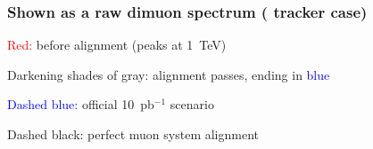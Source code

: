 \documentclass[compress]{beamer}
\begin{document}
\begin{frame}
\frametitle{Shown as a raw dimuon spectrum ( tracker case)}
\begin{center}
\end{center}

\vfill \textcolor{red}{Red:} before alignment (peaks at 1~TeV)

\textcolor{greyone}{Darkening} \textcolor{greytwo}{shades} \textcolor{greythree}{of} \textcolor{greyfour}{gray:} alignment passes, ending in \textcolor{blue}{blue}

\textcolor{blue}{Dashed blue:} official 10~pb$^{-1}$ scenario

Dashed black: perfect muon system alignment
\end{frame}
\end{document}
